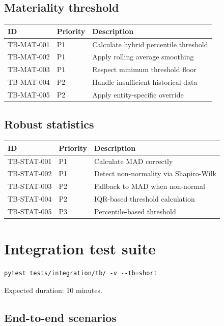 \documentclass[11pt,a4paper,twoside]{report}
\begin{document}
\subsection{Materiality threshold}

\begin{tabularx}{\linewidth}{@{}l l X@{}}
\toprule
\textbf{ID} & \textbf{Priority} & \textbf{Description} \\ \midrule
TB-MAT-001 & P1 & Calculate hybrid percentile threshold \\
TB-MAT-002 & P1 & Apply rolling average smoothing \\
TB-MAT-003 & P1 & Respect minimum threshold floor \\
TB-MAT-004 & P2 & Handle insufficient historical data \\
TB-MAT-005 & P2 & Apply entity-specific override \\
\bottomrule
\end{tabularx}

\subsection{Robust statistics}

\begin{tabularx}{\linewidth}{@{}l l X@{}}
\toprule
\textbf{ID} & \textbf{Priority} & \textbf{Description} \\ \midrule
TB-STAT-001 & P1 & Calculate MAD correctly \\
TB-STAT-002 & P1 & Detect non-normality via Shapiro-Wilk \\
TB-STAT-003 & P2 & Fallback to MAD when non-normal \\
TB-STAT-004 & P2 & IQR-based threshold calculation \\
TB-STAT-005 & P3 & Percentile-based threshold \\
\bottomrule
\end{tabularx}

\section{Integration test suite}

\begin{lstlisting}[basicstyle=\ttfamily\small]
pytest tests/integration/tb/ -v --tb=short
\end{lstlisting}

Expected duration: 10 minutes.

\subsection{End-to-end scenarios}
\end{document}
